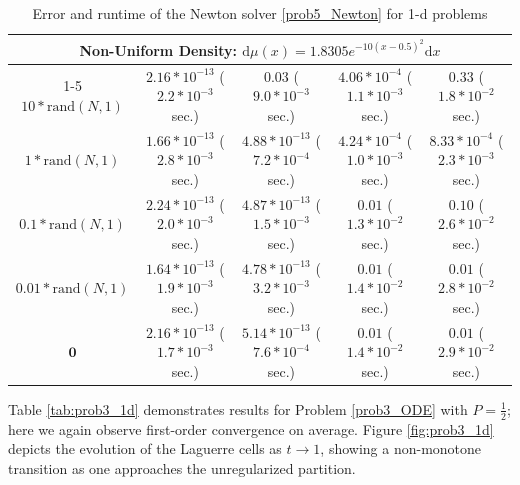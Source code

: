 \documentclass{scrartcl}
\newcommand{\dd}{\mathrm d}
\theoremstyle{plain}
\theoremstyle{definition}
\begin{document}
\begin{table}[ht]
{\begin{tabular}{||c||c|c|c|c||}
        \multicolumn{5}{c}{\Large \textbf{Non-Uniform Density:} $\dd\mu(x) = 1.8305e^{-10(x-0.5)^2}\dd x$}\vspace{0.25em} \\ \cline{1-5}\cline{1-5}
        $10*\text{rand}(N,1)$  & $2.16*10^{-13}$ ($2.2*10^{-3}$ sec.) & $0.03         $ ($9.0*10^{-3}$ sec.) & $4.06*10^{-4}$ ($1.1*10^{-3}$ sec.) & $        0.33$ ($1.8*10^{-2}$ sec.)\\\hline
        $1*\text{rand}(N,1)$   & $1.66*10^{-13}$ ($2.8*10^{-3}$ sec.) & $4.88*10^{-13}$ ($7.2*10^{-4}$ sec.) & $4.24*10^{-4}$ ($1.0*10^{-3}$ sec.) & $8.33*10^{-4}$ ($2.3*10^{-3}$ sec.)\\\hline
        $0.1*\text{rand}(N,1)$ & $2.24*10^{-13}$ ($2.0*10^{-3}$ sec.) & $4.87*10^{-13}$ ($1.5*10^{-3}$ sec.) & $0.01        $ ($1.3*10^{-2}$ sec.) & $        0.10$ ($2.6*10^{-2}$ sec.)\\\hline
        $0.01*\text{rand}(N,1)$& $1.64*10^{-13}$ ($1.9*10^{-3}$ sec.) & $4.78*10^{-13}$ ($3.2*10^{-3}$ sec.) & $0.01        $ ($1.4*10^{-2}$ sec.) & $0.01        $ ($2.8*10^{-2}$ sec.)\\\hline
        $\mathbf{0}$           & $2.16*10^{-13}$ ($1.7*10^{-3}$ sec.) & $5.14*10^{-13}$ ($7.6*10^{-4}$ sec.) & $0.01        $ ($1.4*10^{-2}$ sec.) & $0.01        $ ($2.9*10^{-2}$ sec.)\\\hline
        \hline
    \end{tabular}}
    \caption{Error and runtime of the Newton solver \eqref{prob5_Newton} for  1-d problems} \label{tab:prob5_1d}
\end{table}

Table \ref{tab:prob3_1d} demonstrates results for Problem \eqref{prob3_ODE} with \(P=\tfrac{1}{2}\); here we again observe first-order convergence on average. Figure \ref{fig:prob3_1d} depicts the evolution of the Laguerre cells as $t\to 1$, showing a non-monotone transition as one approaches the unregularized partition.
\end{document}
